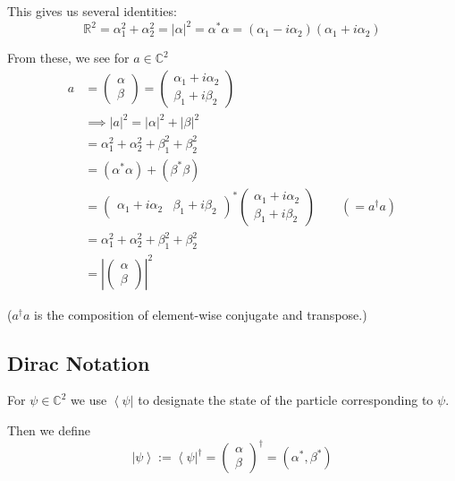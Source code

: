 \documentclass[12pt]{article}
\newcommand{\R}{\mathbb{R}}
\newcommand{\bra}[1]{\left\langle #1 \right\vert }
\newcommand{\ket}[1]{\left\vert #1 \right\rangle}
\begin{document}
This gives us several identities:
\[\R^2 = \alpha_1^2 + \alpha_2^2 = |\alpha|^2 = \alpha^* \alpha = (\alpha_1 - i\alpha_2)(\alpha_1 + i\alpha_2)\]

From these, we see for $a \in \mathbb{C}^2$ 
\begin{align*}
    a &= \begin{pmatrix}
        \alpha\\
        \beta
    \end{pmatrix} = \begin{pmatrix}
        \alpha_1 + i\alpha_2\\
        \beta_1 + i \beta_2
    \end{pmatrix}\\
    &\implies |a|^2 = |\alpha|^2 + |\beta|^2\\
    &= \alpha_1^2 + \alpha_2^2 + \beta_1^2 + \beta_2^2\\
    &= (\alpha^* \alpha) + (\beta^* \beta)\\
    &= \begin{pmatrix}
        \alpha_1 + i\alpha_2 & \beta_1 + i\beta_2
    \end{pmatrix}^* \begin{pmatrix}
        \alpha_1 + i\alpha_2\\
        \beta_1 + i\beta_2
    \end{pmatrix} \qquad (=a^\dagger a)\\
    &= \alpha_1^2 + \alpha_2^2 + \beta_1^2 + \beta_2^2\\
    &= \left|\begin{pmatrix}
        \alpha\\
        \beta
    \end{pmatrix}\right|^2
\end{align*}

($a^\dagger a$ is the composition of element-wise conjugate and transpose.)

\subsection*{Dirac Notation}
For $\psi \in \mathbb{C}^2$ we use $\bra{\psi}$ to designate the state of the particle corresponding to $\psi$. 

Then we define 
\[\ket{\psi} := \bra{\psi}^\dagger = \begin{pmatrix}
    \alpha\\
    \beta
\end{pmatrix}^{\dagger} = (\alpha^*, \beta^*)\]
\end{document}
